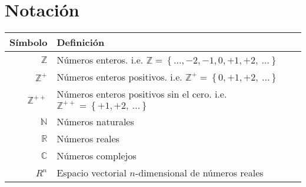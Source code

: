 \chapter*{Notación}


\begin{table}[ht!]
    \begin{center}
        \begin{tabularx}{\textwidth}{|r|X|}
            \hline
            \textbf{Símbolo}                                                  & \textbf{Definición}                                                                                                        \\
            \hline
            $ \mathbb{Z} $                                                    & Números enteros. \newline i.e. \scriptsize{${ \mathbb{Z}  = \left\{ \ldots, -2, -1, 0, +1, +2,~\ldots \right\} }$}         \\
            $ \mathbb{Z}^{+} $                                                & Números enteros positivos. \newline \scriptsize{i.e. ${ \mathbb{Z}^{+}  = \left\{ 0, +1, +2,~\ldots \right\} }$}           \\
            $ \mathbb{Z}^{++} $                                               & Números enteros positivos sin el cero. \newline i.e. \scriptsize{${ \mathbb{Z}^{++}  = \left\{ +1, +2,~\ldots \right\} }$} \\
            $ \mathbb{N} $                                                    & Números naturales                                                                                                          \\
            $ \mathbb{R} $                                                    & Números reales                                                                                                             \\
            $ \mathbb{C} $                                                    & Números complejos                                                                                                          \\
            $ R^{n} $                                                         & Espacio vectorial $n$-dimensional de números reales                                                                        \\


\end{tabularx}
\end{center}
\end{table}
